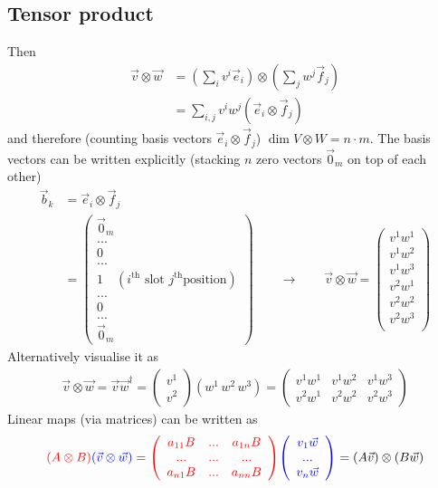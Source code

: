 \documentclass[../main.tex]{subfiles}
\begin{document}
\subsection{Tensor product}
Then
\begin{align}
\vec{v}\otimes\vec{w}
&=(\sum_i v^i\vec{e}_i)\otimes(\sum_j w^j\vec{f}_j)\\
&=\sum_{i,j} v^iw^j (\vec{e}_i\otimes\vec{f}_j)
\end{align}
and therefore (counting basis vectors $\vec{e}_i\otimes\vec{f}_j$) $\dim{V\otimes W}=n\cdot m$. The basis vectors can be written explicitly (stacking $n$ zero vectors $\vec{0}_m$ on top of each other)
\begin{align}
\vec{b}_k
&=\vec{e}_i\otimes\vec{f}_j\\
&=\left(\begin{array}{l}
\vec{0}_m\\ \hline
...\\ \hline
0\\
...\\
1 \quad(i^\text{th} \text{ slot } j^\text{th} \text{position})\\ 
...\\
0\\ \hline
...\\ \hline
\vec{0}_m
\end{array}\right)
\qquad\rightarrow\qquad
\vec{v}\otimes\vec{w}
=\left(\begin{array}{l}
v^1w^1\\
v^1w^2\\
v^1w^3\\ \hline
v^2w^1\\
v^2w^2\\
v^2w^3\\
\end{array}\right)
\end{align}
Alternatively visualise it as
\begin{align}
\vec{v}\otimes\vec{w}
=\vec{v}\vec{w}^\dagger
=\left(\begin{matrix}
v^1\\v^2
\end{matrix}\right)
(w^1\,w^2\,w^3)
=\left(\begin{matrix}
v^1w^1 & v^1w^2 & v^1w^3 \\
v^2w^1 & v^2w^2 & v^2w^3
\end{matrix}\right)
\end{align}
Linear maps (via matrices) can be written as
\begin{align}
\textcolor{red}{(A\otimes B)}
\textcolor{blue}{(\vec{v}\otimes\vec{w})}=
\textcolor{red}{
\left(\begin{array}{ccc}
a_{11} B & ... & a_{1n}B\\
...      & ... & ...\\
a_{n1} B & ... & a_{nn}B\\
\end{array}\right)}
\textcolor{blue}{
\left(\begin{array}{c}
v_1\vec{w}\\
...\\
v_n \vec{w}
\end{array}\right)}
=(A\vec{v})\otimes(B\vec{w})
\end{align}
\end{document}
